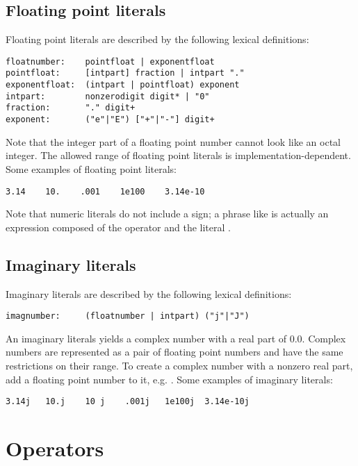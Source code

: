 \subsection{Floating point literals}

Floating point literals are described by the following lexical
definitions:

\begin{verbatim}
floatnumber:    pointfloat | exponentfloat
pointfloat:     [intpart] fraction | intpart "."
exponentfloat:  (intpart | pointfloat) exponent
intpart:        nonzerodigit digit* | "0"
fraction:       "." digit+
exponent:       ("e"|"E") ["+"|"-"] digit+
\end{verbatim}

Note that the integer part of a floating point number cannot look like
an octal integer.
The allowed range of floating point literals is
implementation-dependent.
Some examples of floating point literals:

\begin{verbatim}
3.14    10.    .001    1e100    3.14e-10
\end{verbatim}

Note that numeric literals do not include a sign; a phrase like
 is actually an expression composed of the operator
\code{-} and the literal .

\subsection{Imaginary literals}

Imaginary literals are described by the following lexical definitions:

\begin{verbatim}
imagnumber:     (floatnumber | intpart) ("j"|"J")
\end{verbatim}

An imaginary literals yields a complex number with a real part of
0.0.  Complex numbers are represented as a pair of floating point
numbers and have the same restrictions on their range.  To create a
complex number with a nonzero real part, add a floating point number
to it, e.g. .  Some examples of imaginary literals:

\begin{verbatim}
3.14j   10.j    10 j    .001j   1e100j  3.14e-10j 
\end{verbatim}


\section{Operators}


